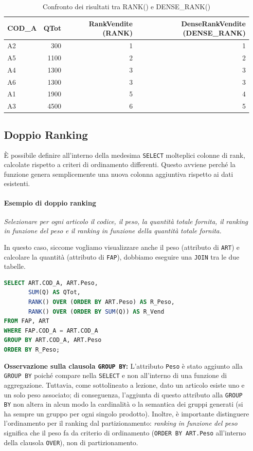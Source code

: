 \begin{table}[H]
\centering
\caption{Confronto dei risultati tra RANK() e DENSE\_RANK()}
\begin{tabular}{lrr | r}
\toprule
\textbf{COD\_A} & \textbf{QTot} & \textbf{RankVendite (RANK)} & \textbf{DenseRankVendite (DENSE\_RANK)} \\
\midrule
A2 & 300  & 1 & 1 \\
A5 & 1100 & 2 & 2 \\
A4 & 1300 & 3 & 3 \\
A6 & 1300 & 3 & 3 \\
A1 & 1900 & 5 & 4 \\
A3 & 4500 & 6 & 5 \\
\bottomrule
\end{tabular}
\end{table}

\subsection{Doppio Ranking}

È possibile definire all'interno della medesima \texttt{SELECT} molteplici colonne di rank, calcolate rispetto a criteri di ordinamento differenti. Questo avviene perché la funzione genera semplicemente una nuova colonna aggiuntiva rispetto ai dati esistenti.

\paragraph{Esempio di doppio ranking}
\textit{Selezionare per ogni articolo il codice, il peso, la quantità totale fornita, il ranking in funzione del peso e il ranking in funzione della quantità totale fornita.}

In questo caso, siccome vogliamo visualizzare anche il peso (attributo di \texttt{ART}) e calcolare la quantità (attributo di \texttt{FAP}), dobbiamo eseguire una \texttt{JOIN} tra le due tabelle.

\begin{lstlisting}[language=SQL, basicstyle=\small\ttfamily, keywordstyle=\bfseries\color{blue}, frame=single]
SELECT ART.COD_A, ART.Peso,
       SUM(Q) AS QTot,
       RANK() OVER (ORDER BY ART.Peso) AS R_Peso,
       RANK() OVER (ORDER BY SUM(Q)) AS R_Vend
FROM FAP, ART
WHERE FAP.COD_A = ART.COD_A
GROUP BY ART.COD_A, ART.Peso
ORDER BY R_Peso;
\end{lstlisting}

\textbf{Osservazione sulla clausola \texttt{GROUP BY}:} L'attributo \texttt{Peso} è stato aggiunto alla \texttt{GROUP BY} poiché compare nella \texttt{SELECT} e non all'interno di una funzione di aggregazione. Tuttavia, come sottolineato a lezione, dato un articolo esiste uno e un solo peso associato; di conseguenza, l'aggiunta di questo attributo alla \texttt{GROUP BY} non altera in alcun modo la cardinalità o la semantica dei gruppi generati (si ha sempre un gruppo per ogni singolo prodotto).
Inoltre, è importante distinguere l'ordinamento per il ranking dal partizionamento: \textit{ranking in funzione del peso} significa che il peso fa da criterio di ordinamento (\texttt{ORDER BY ART.Peso} all'interno della clausola \texttt{OVER}), non di partizionamento. 

